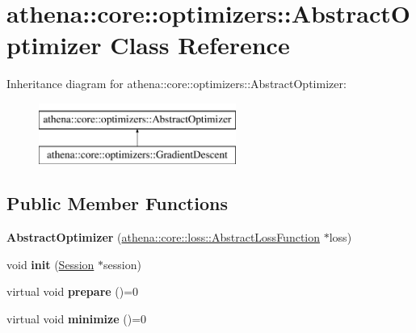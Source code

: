 \hypertarget{classathena_1_1core_1_1optimizers_1_1_abstract_optimizer}{}\section{athena\+:\+:core\+:\+:optimizers\+:\+:Abstract\+Optimizer Class Reference}
\label{classathena_1_1core_1_1optimizers_1_1_abstract_optimizer}
Inheritance diagram for athena\+:\+:core\+:\+:optimizers\+:\+:Abstract\+Optimizer\+:\begin{figure}[H]
\begin{center}
\leavevmode
\includegraphics[height=2.000000cm]{d5/d97/classathena_1_1core_1_1optimizers_1_1_abstract_optimizer}
\end{center}
\end{figure}
\subsection*{Public Member Functions}
\begin{DoxyCompactItemize}
\item 
\mbox{\label{classathena_1_1core_1_1optimizers_1_1_abstract_optimizer_a87422b9b479a84aa2b882e54e7ba22d5}} 
{\bfseries Abstract\+Optimizer} (\mbox{\hyperlink{classathena_1_1core_1_1loss_1_1_abstract_loss_function}{athena\+::core\+::loss\+::\+Abstract\+Loss\+Function}} $\ast$loss)
\item 
\mbox{\label{classathena_1_1core_1_1optimizers_1_1_abstract_optimizer_a4aaf186d6810a25cf54015ba23e0a809}} 
void {\bfseries init} (\mbox{\hyperlink{classathena_1_1core_1_1_session}{Session}} $\ast$session)
\item 
\mbox{\label{classathena_1_1core_1_1optimizers_1_1_abstract_optimizer_a1131df49e42aff2009ccd22621a6447e}} 
virtual void {\bfseries prepare} ()=0
\item 
\mbox{\label{classathena_1_1core_1_1optimizers_1_1_abstract_optimizer_ad0106d7566fd68761a502aa7bff24c68}} 
virtual void {\bfseries minimize} ()=0
\end{DoxyCompactItemize}
